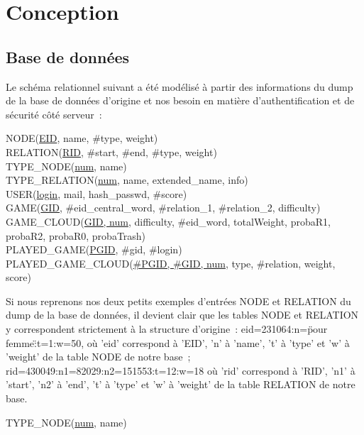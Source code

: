 \documentclass[a4paper,11pt,french]{article}
\begin{document}
\section{Conception}


\subsection{Base de données}

Le schéma relationnel suivant a été modélisé à partir des informations du dump de la base de données d'origine et nos besoin en matière d'authentification et de sécurité côté serveur~:

{\footnotesize
NODE(\underline{EID}, name, \#type, weight) \\ 
RELATION(\underline{RID}, \#start, \#end, \#type, weight) \\
TYPE\_NODE(\underline{num}, name) \\
TYPE\_RELATION(\underline{num}, name, extended\_name, info) \\
USER(\underline{login}, mail, hash\_passwd, \#score) \\
GAME(\underline{GID}, \#eid\_central\_word, \#relation\_1, \#relation\_2, difficulty) \\
GAME\_CLOUD(\underline{GID, num}, difficulty, \#eid\_word, totalWeight, probaR1, probaR2, probaR0, probaTrash) \\
PLAYED\_GAME(\underline{PGID}, \#gid, \#login) \\
PLAYED\_GAME\_CLOUD(\underline{\#PGID, \#GID, num}, type, \#relation, weight, score) 
}

Si nous reprenons nos deux petits exemples d'entrées NODE et RELATION du dump de la base de données, il devient clair que les tables NODE et RELATION y correspondent strictement à la structure d'origine~: eid=231064:n=\"pour femme\":t=1:w=50, où 'eid' correspond à 'EID', 'n' à 'name', 't' à 'type' et 'w' à 'weight' de la table NODE de notre base~; rid=430049:n1=82029:n2=151553:t=12:w=18 où 'rid' correspond à 'RID', 'n1' à 'start', 'n2' à 'end', 't' à 'type' et 'w' à 'weight' de la table RELATION de notre base. 



TYPE\_NODE(\underline{num}, name) \\


\end{document}
